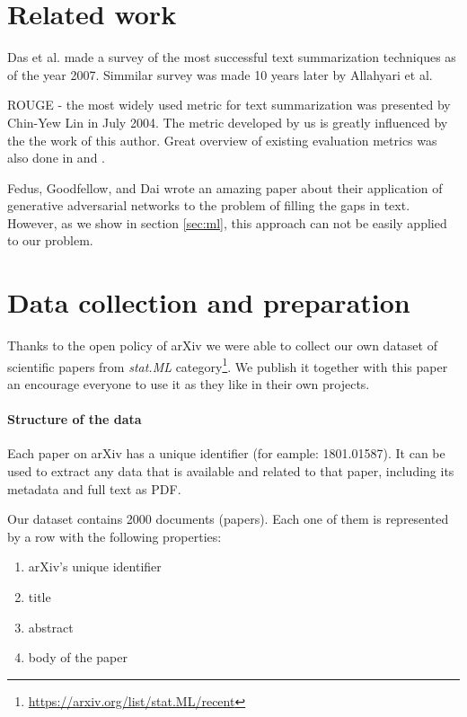 \documentclass[sigplan]{acmart}
\begin{document}
\section{Related work}

Das et al. made a survey of the most successful text summarization techniques as of the year 2007\cite{das-7}. Simmilar survey was made 10 years later by Allahyari et al\cite{allahyari-17}.

ROUGE - the most widely used metric for text summarization was presented by Chin-Yew Lin in July 2004\cite{lin-4}. The metric developed by us is greatly influenced by the the work of this author. Great overview of existing evaluation metrics was also done in \cite{das-7} and \cite{allahyari-17}.

Fedus, Goodfellow, and Dai\cite{fedus-18} wrote an amazing paper about their application of generative adversarial networks to the problem of filling the gaps in text. However, as we show in section \ref{sec:ml}, this approach can not be easily applied to our problem.

\section{Data collection and preparation}
\label{sec:data}

Thanks to the open policy of arXiv we were able to collect our own dataset of scientific papers from \textit{stat.ML} category\footnote{\url{https://arxiv.org/list/stat.ML/recent}}. We publish it together with this paper an encourage everyone to use it as they like in their own projects.

\paragraph{Structure of the data} Each paper on arXiv has a unique identifier (for eample: 1801.01587). It can be used to extract any data that is available and related to that paper, including its metadata and full text as PDF.

Our dataset contains 2000 documents (papers). Each one of them is represented by a row with the following properties:

\begin{enumerate}
  \item arXiv's unique identifier
  \item title
  \item abstract
  \item body of the paper
\end{enumerate}
\end{document}
